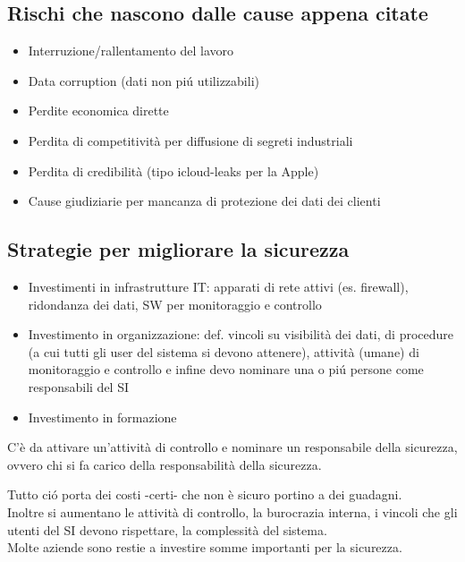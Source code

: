 \subsection{Rischi che nascono dalle cause appena citate}

\begin{itemize}

\item
  Interruzione/rallentamento del lavoro
\item
  Data corruption (dati non pi\'u utilizzabili)
\item
  Perdite economica dirette
\item
  Perdita di competitivit\`a per diffusione di segreti industriali
\item
  Perdita di credibilit\`a (tipo icloud-leaks per la Apple)
\item
  Cause giudiziarie per mancanza di protezione dei dati dei clienti
\end{itemize}

\subsection{Strategie per migliorare la
sicurezza}

\begin{itemize}

\item
  Investimenti in infrastrutture IT: apparati di rete attivi (es.
  firewall), ridondanza dei dati, SW per monitoraggio e controllo
\item
  Investimento in organizzazione: def. vincoli su visibilit\`a dei dati,
  di procedure (a cui tutti gli user del sistema si devono attenere),
  attivit\`a (umane) di monitoraggio e controllo e infine devo nominare
  una o pi\'u persone come responsabili del SI
\item
  Investimento in formazione
\end{itemize}

C'è da attivare un'attivit\`a di controllo e nominare un responsabile della 
sicurezza, ovvero chi si fa carico della responsabilità della sicurezza.

Tutto ci\'o porta dei costi -certi- che non \`e sicuro portino a dei
guadagni.\\
Inoltre si aumentano le attivit\`a di controllo, la burocrazia interna, i
vincoli che gli utenti del SI devono rispettare, la complessit\`a del
sistema.\\
Molte aziende sono restie a investire somme importanti per la
sicurezza.

